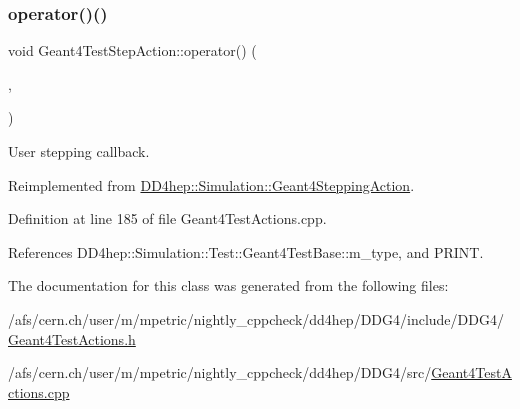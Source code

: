 \subsubsection{\texorpdfstring{operator()()}{operator()()}}
{\footnotesize\ttfamily void Geant4\+Test\+Step\+Action\+::operator() (\begin{DoxyParamCaption}\item[{const G4\+Step $\ast$}]{,  }\item[{G4\+Stepping\+Manager $\ast$}]{ }\end{DoxyParamCaption})\hspace{0.3cm}{\ttfamily [virtual]}}



User stepping callback. 



Reimplemented from \hyperlink{class_d_d4hep_1_1_simulation_1_1_geant4_stepping_action_ab6b61f6eaed6d06ddb3a7ed319258317}{D\+D4hep\+::\+Simulation\+::\+Geant4\+Stepping\+Action}.



Definition at line 185 of file Geant4\+Test\+Actions.\+cpp.



References D\+D4hep\+::\+Simulation\+::\+Test\+::\+Geant4\+Test\+Base\+::m\+\_\+type, and P\+R\+I\+NT.



The documentation for this class was generated from the following files\+:\begin{DoxyCompactItemize}
\item 
/afs/cern.\+ch/user/m/mpetric/nightly\+\_\+cppcheck/dd4hep/\+D\+D\+G4/include/\+D\+D\+G4/\hyperlink{_geant4_test_actions_8h}{Geant4\+Test\+Actions.\+h}\item 
/afs/cern.\+ch/user/m/mpetric/nightly\+\_\+cppcheck/dd4hep/\+D\+D\+G4/src/\hyperlink{_geant4_test_actions_8cpp}{Geant4\+Test\+Actions.\+cpp}\end{DoxyCompactItemize}

